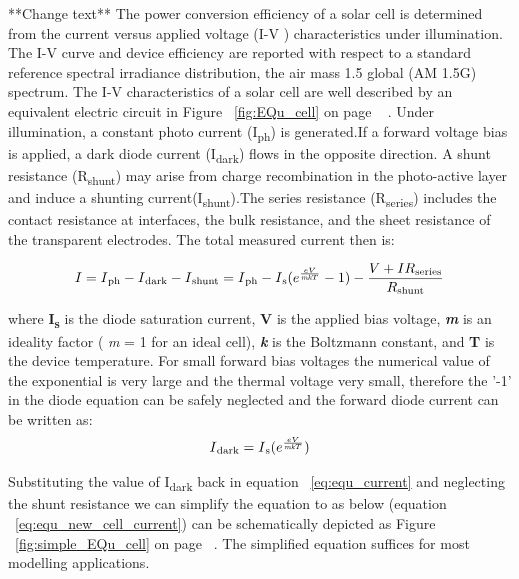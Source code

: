 **Change text**  
The power conversion efficiency of a solar cell is determined from the current versus applied voltage (I-V ) characteristics under illumination. The I-V curve and device efficiency are reported with respect to a standard reference spectral irradiance distribution, the air mass 1.5 global (AM 1.5G) spectrum\cite{wenger2010strategies}. The I-V characteristics of a solar cell are well described by an equivalent electric circuit in Figure ~\ref{fig:EQu_cell} on page ~\pageref{fig:EQu_cell} . Under illumination, a constant photo current (I\textsubscript{ph}) is generated.If a forward voltage bias is applied, a dark diode current (I\textsubscript{dark}) flows in the opposite direction. A shunt resistance (R\textsubscript{shunt}) may arise from charge recombination in the photo-active layer and induce a shunting current(I\textsubscript{shunt}).The series resistance (R\textsubscript{series}) includes the contact resistance at interfaces, the bulk resistance, and the sheet resistance of the transparent electrodes. The total measured current then is:
 
 \begin{equation}
 \begin{aligned}
  I = I\textsubscript{ph} - I\textsubscript{dark} - I\textsubscript{shunt} = I\textsubscript{ph} -  I\textsubscript{s} (e^{\frac{eV}{\textit{mk}T}}-1) - \dfrac{V+IR\textsubscript{series}}{R\textsubscript{shunt}}
   \label{eq:equ_current}
   \end{aligned}
   \end{equation}

 where \textbf{I\textsubscript{s}} is the diode saturation current, \textbf{V} is the applied bias voltage, \textbf{\textit{m}} is an ideality factor ( \textit{m} = 1 for an ideal cell), \textbf{\textit{k}} is the Boltzmann constant, and \textbf{T} is the device temperature\cite{wenger2010strategies}. For small forward bias voltages the numerical value of the exponential is very large and 
  the thermal voltage very small, therefore the '-1' in the diode equation can be safely neglected and the forward diode current can be written as\cite{pv_education_org}:
  \begin{equation}
   \begin{aligned}
    I\textsubscript{dark}= I\textsubscript{s} (e^{\frac{eV}{\textit{mk}T}}) 
    \label{eq:equ_current_dark}
    \end{aligned}
   \end{equation}
   
   Substituting the value of I\textsubscript{dark} back in equation ~\ref{eq:equ_current} and neglecting the shunt resistance we can simplify the equation to as below (equation ~\ref{eq:equ_new_cell_current}) can be schematically depicted as Figure ~\ref{fig:simple_EQu_cell} on page ~\pageref{fig:simple_EQu_cell}. The simplified equation suffices for most modelling applications.
   
